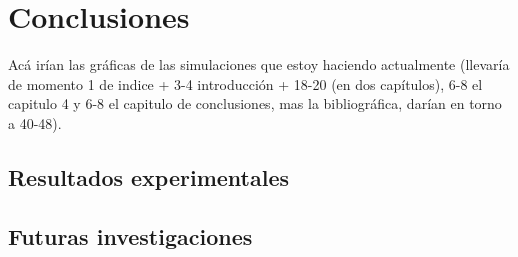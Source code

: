 \newpage
\thispagestyle{empty}
\mbox{}

\chapter{Conclusiones}
\label{ch:chapter5}


Acá irían las gráficas de las simulaciones que estoy haciendo actualmente (llevaría de momento 1 de indice + 3-4 introducción + 18-20 (en dos capítulos), 6-8 el capitulo 4 y 6-8 el capitulo de conclusiones, mas la bibliográfica, darían en torno a 40-48).

\section{Resultados experimentales}

\section{Futuras investigaciones}